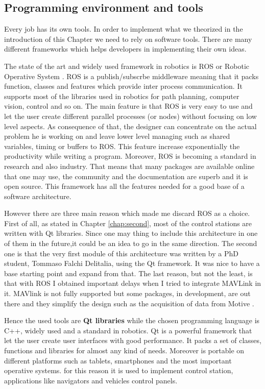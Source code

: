 \subsection{Programming environment and tools}

Every job has its own tools. In order to implement what we theorized in the introduction of this Chapter we need to rely on software tools. There are many different frameworks which helps developers in implementing their own ideas.

 The state of the art and widely used framework in robotics is ROS or Robotic Operative System \cite{ROS}. ROS is a publish/subscrbe middleware meaning that it packs function, classes and features which provide inter process communication. It supports most of the libraries used in robotics for path planning, computer vision, control and so on. The main feature is that ROS is very easy to use and let the user create different parallel processes (or nodes) without focusing on low level aspects. As consequence of that, the designer can concentrate on the actual problem he is working on and leave lower level managing such as shared variables, timing or buffers to ROS. This feature increase exponentially the productivity while writing a program. Moreover, ROS is becoming a standard in research and also industry. That means that many packages are available online that one may use, the community and the documentation are superb and it is open source. This framework has all the features needed for a good base of a software architecture.
 
 However there are three main reason which made me discard ROS as a choice. First of all, as stated in Chapter \ref{chap:second}, most of the control stations are written with Qt libraries. Since one may thing to include this architecture in one of them in the future,it could be an idea to go in the same direction. The second one is that the very first module of this architecture was written by a PhD student, Tommaso Falchi Delitalia, using the Qt framework. It was nice to have a base starting point and expand from that. The last reason, but not the least, is that with ROS I obtained important delays when I tried to integrate MAVLink in it. MAVlink is not fully supported but some packages, in development, are out there and they simplify the design such as the acquisition of data from Motive \cite{optiros}.

Hence the used tools are \textbf{Qt libraries} \cite{qt} while the chosen programming language is C++, widely used and a standard in robotics. Qt is a powerful framework that let the user create user interfaces with good performance. It packs a set of classes, functions and libraries for almost any kind of needs. Moreover is portable on different platforms such as tablets, smartphones and the most important operative systems. for this reason it is used to implement control station, applications like navigators and vehicles control panels.

